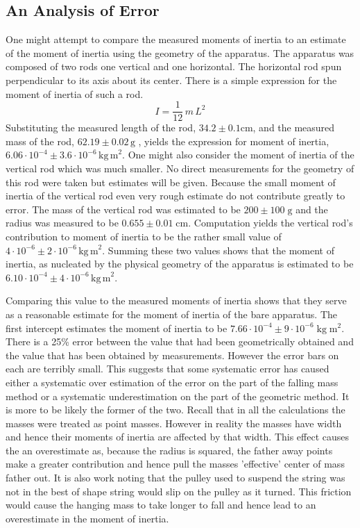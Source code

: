 \documentclass[11pt]{article}
\begin{document}
\subsection{An Analysis of Error}
One might attempt to compare the measured moments of inertia to an estimate of the moment of inertia using the geometry of the apparatus. The apparatus was composed of two rods one vertical and one horizontal. The horizontal rod spun perpendicular to its axis about its center. There is a simple expression for the moment of inertia of such a rod.
\begin{equation}
I = \frac{1}{12}\, m \, L^2
\end{equation}
Substituting the measured length of the rod, \(34.2 \pm 0.1 \mathrm{cm}\), and the measured mass of the rod, \(62.19 \pm 0.02 \, \mathrm{g} \) , yields the expression for moment of inertia, \(6.06 \cdot 10^{-4} \pm 3.6 \cdot 10^{-6} \mathrm{\, kg \, m}^2\). One might also consider the moment of inertia of the vertical rod which was much smaller. No direct measurements for the geometry of this rod were taken but estimates will be given. Because the small moment of inertia of the vertical rod even very rough estimate do not contribute greatly to error. The mass of the vertical rod was estimated to be \(200 \pm 100 \; \mathrm{g} \) and the radius was measured to be \(0.655 \pm 0.01 \; \mathrm{cm}\). Computation yields the vertical rod's contribution to moment of inertia to be the rather small value of \(4 \cdot 10^{-6} \pm 2 \cdot 10^{-6} \mathrm{\, kg \, m}^2\). Summing these two values shows that the moment of inertia, as nucleated by the physical geometry of the apparatus is estimated to be \(6.10 \cdot 10^{-4} \pm 4 \cdot 10^{-6} \mathrm{\, kg \, m}^2\).

Comparing this value to the measured moments of inertia shows that they serve as a reasonable estimate for the moment of inertia of the bare apparatus. The first intercept estimates the moment of inertia to be \(7.66 \cdot 10^{-4} \pm 9 \cdot 10 ^{-6}  \; \mathrm{kg} \; \mathrm{m}^2 \). There is a 25\%  error between the value that had been geometrically obtained and the value that has been obtained by measurements. However the error bars on each are terribly small. This suggests that some systematic error has caused either a systematic over estimation of the error on the part of the falling mass method or a systematic underestimation on the part of the geometric method. It is more to be likely the former of the two. Recall that in all the calculations the masses were treated as point masses. However in reality the masses have width and hence their moments of inertia are affected by that width. This effect causes the an overestimate as, because the radius is squared, the father away points make a greater contribution and hence pull the masses 'effective' center of mass father out. It is also work noting that the pulley used to suspend the string was not in the best of shape string would slip on the pulley as it turned. This friction would cause the hanging mass to take longer to fall and hence lead to an overestimate in the moment of inertia.
\end{document}
